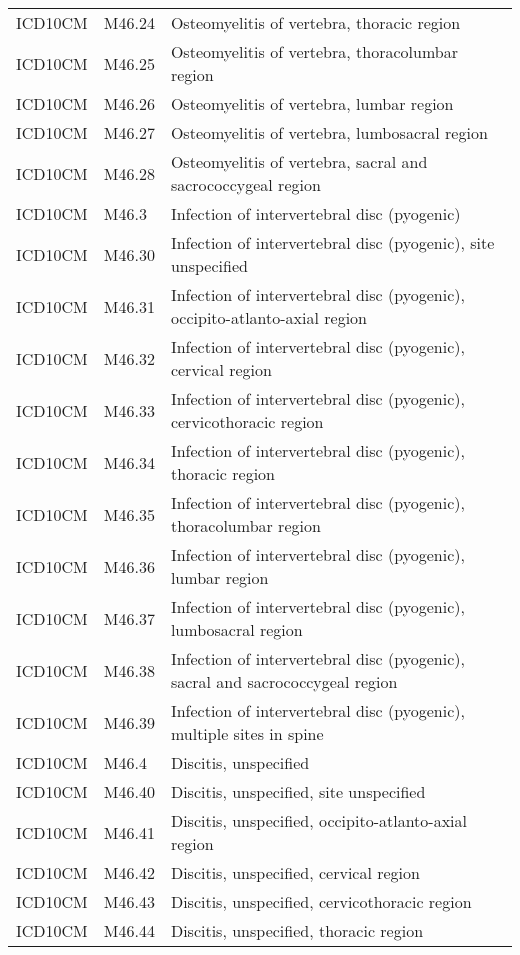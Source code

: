 \begin{table}[ht]
\begin{tabular}{lll}
  ICD10CM & M46.24 & Osteomyelitis of vertebra, thoracic region \\ 
  ICD10CM & M46.25 & Osteomyelitis of vertebra, thoracolumbar region \\ 
  ICD10CM & M46.26 & Osteomyelitis of vertebra, lumbar region \\ 
  ICD10CM & M46.27 & Osteomyelitis of vertebra, lumbosacral region \\ 
  ICD10CM & M46.28 & Osteomyelitis of vertebra, sacral and sacrococcygeal region \\ 
  ICD10CM & M46.3 & Infection of intervertebral disc (pyogenic) \\ 
  ICD10CM & M46.30 & Infection of intervertebral disc (pyogenic), site unspecified \\ 
  ICD10CM & M46.31 & Infection of intervertebral disc (pyogenic), occipito-atlanto-axial region \\ 
  ICD10CM & M46.32 & Infection of intervertebral disc (pyogenic), cervical region \\ 
  ICD10CM & M46.33 & Infection of intervertebral disc (pyogenic), cervicothoracic region \\ 
  ICD10CM & M46.34 & Infection of intervertebral disc (pyogenic), thoracic region \\ 
  ICD10CM & M46.35 & Infection of intervertebral disc (pyogenic), thoracolumbar region \\ 
  ICD10CM & M46.36 & Infection of intervertebral disc (pyogenic), lumbar region \\ 
  ICD10CM & M46.37 & Infection of intervertebral disc (pyogenic), lumbosacral region \\ 
  ICD10CM & M46.38 & Infection of intervertebral disc (pyogenic), sacral and sacrococcygeal region \\ 
  ICD10CM & M46.39 & Infection of intervertebral disc (pyogenic), multiple sites in spine \\ 
  ICD10CM & M46.4 & Discitis, unspecified \\ 
  ICD10CM & M46.40 & Discitis, unspecified, site unspecified \\ 
  ICD10CM & M46.41 & Discitis, unspecified, occipito-atlanto-axial region \\ 
  ICD10CM & M46.42 & Discitis, unspecified, cervical region \\ 
  ICD10CM & M46.43 & Discitis, unspecified, cervicothoracic region \\ 
  ICD10CM & M46.44 & Discitis, unspecified, thoracic region \\ 

\end{tabular}
\end{table}
